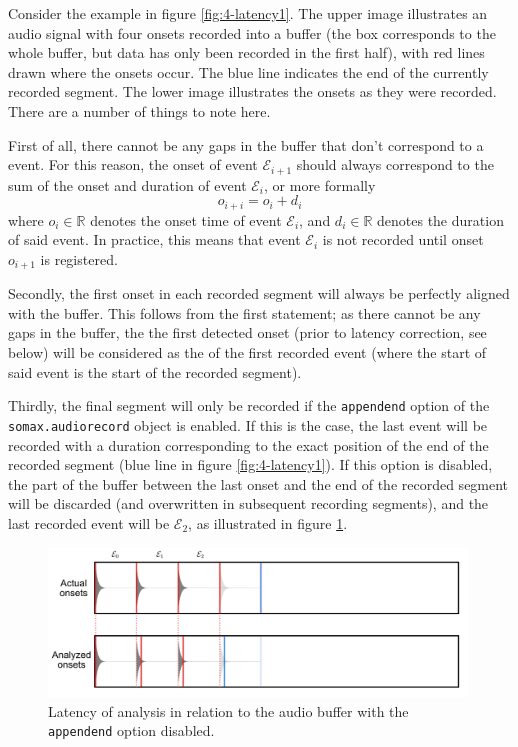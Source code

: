Consider the example in figure \ref{fig:4-latency1}. The upper image illustrates an audio signal with four onsets recorded into a buffer (the box corresponds to the whole buffer, but data has only been recorded in the first half), with red lines drawn where the onsets occur. The blue line indicates the end of the currently recorded segment. The lower image illustrates the onsets as they were recorded. There are a number of things to note here. 

First of all,  there cannot be any gaps in the buffer that don't correspond to a event. For this reason, the onset of event $\mathcal E_{i+1}$ should always correspond to the sum of the onset and duration of event $\mathcal E_i$, or more formally
$$
o_{i+i} = o_{i} + d_i
$$
where $o_i \in \mathbb R$ denotes the onset time of event $\mathcal E_i$, and $d_i \in \mathbb R$ denotes the duration of said event. In practice,  this means that event $\mathcal E_i$ is not recorded until onset $o_{i+1}$ is registered.

Secondly, the first onset in each recorded segment will always be perfectly aligned with the buffer. This follows from the first statement; as there cannot be any gaps in the buffer, the the first detected onset (prior to latency correction, see below) will be considered as the  of the first recorded event (where the start of said event is the start of the recorded segment).

Thirdly,  the final segment will only be recorded if the \texttt{appendend} option of the \texttt{somax.audiorecord} object is enabled. If this is the case, the last event will be recorded with a duration corresponding to the exact position of the end of the recorded segment (blue line in figure \ref{fig:4-latency1}). If this option is disabled, the part of the buffer between the last onset and the end of the recorded segment will be discarded (and overwritten in subsequent recording segments), and the last recorded event will be $\mathcal E_2$, as illustrated in figure \ref{fig:4-latency2}.

 \begin{figure}[h!]
    \centering        
 	\includegraphics[width=0.99\textwidth, keepaspectratio]{figures/latency3.png}
    \caption{Latency of analysis in relation to the audio buffer with the \texttt{appendend} option disabled.}
    \label{fig:4-latency2}
\end{figure}

